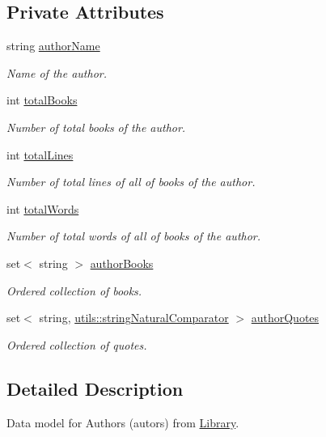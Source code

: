 \subsection*{Private Attributes}
\begin{DoxyCompactItemize}
\item 
string \hyperlink{class_author_a146b76b89d701097c36fb5d29df27bc4}{author\+Name}
\begin{DoxyCompactList}\small\item\em Name of the author. \end{DoxyCompactList}\item 
int \hyperlink{class_author_ac870b8c861aa0f69cd2c4e7b8d414902}{total\+Books}
\begin{DoxyCompactList}\small\item\em Number of total books of the author. \end{DoxyCompactList}\item 
int \hyperlink{class_author_a8d818414bbd909287641b388601bf61a}{total\+Lines}
\begin{DoxyCompactList}\small\item\em Number of total lines of all of books of the author. \end{DoxyCompactList}\item 
int \hyperlink{class_author_a478c72fff965eb1ee8fcaddfe173715b}{total\+Words}
\begin{DoxyCompactList}\small\item\em Number of total words of all of books of the author. \end{DoxyCompactList}\item 
set$<$ string $>$ \hyperlink{class_author_ad9ffe450cdafed2242936f6fcafa22b4}{author\+Books}
\begin{DoxyCompactList}\small\item\em Ordered collection of books. \end{DoxyCompactList}\item 
set$<$ string, \hyperlink{structutils_1_1string_natural_comparator}{utils\+::string\+Natural\+Comparator} $>$ \hyperlink{class_author_a117bc50449e2f8d61f30632dde7d73ff}{author\+Quotes}
\begin{DoxyCompactList}\small\item\em Ordered collection of quotes. \end{DoxyCompactList}\end{DoxyCompactItemize}


\subsection{Detailed Description}
Data model for Authors (autors) from \hyperlink{class_library}{Library}. 

